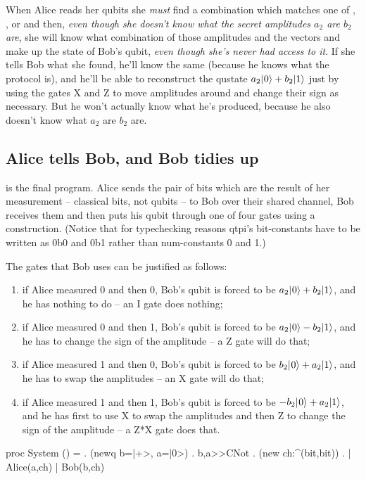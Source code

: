 When Alice reads her qubits she \emph{must} find a combination which matches one of \zerozero, \zeroone, \onezero{} or \oneone{} and then, \emph{even though she doesn't know what the secret amplitudes $a_{2}$ are $b_{2}$ are}, she will know what combination of those amplitudes and the vectors \zero{} and \one{} make up the state of Bob's qubit, \emph{even though she's never had access to it}. If she tells Bob what she found, he'll know the same (because he knows what the protocol is), and he'll be able to reconstruct the qustate $a_{2}|\hspace{0.5pt}0\rangle+b_{2}|1\rangle\relax$ just by using the gates X and Z to move amplitudes around and change their sign as necessary. But he won't actually know what he's produced, because he also doesn't know what $a_{2}$ are $b_{2}$ are.

\subsection{Alice tells Bob, and Bob tidies up}

 is the final program. Alice sends the pair of bits which are the result of her measurement -- classical bits, not qubits -- to Bob over their shared channel, Bob receives them and then puts his qubit through one of four gates using a  construction. (Notice that for typechecking reasons qtpi's bit-constants have to be written as 0b0 and 0b1 rather than num-constants 0 and 1.) 

The gates that Bob uses can be justified as follows:

\begin{enumerate}
\item if Alice measured 0 and then 0, Bob's qubit is forced to be $a_{2}|\hspace{0.5pt}0\rangle+b_{2}|1\rangle\relax$, and he has nothing to do -- an I gate does nothing; 
\item if Alice measured 0 and then 1, Bob's qubit is forced to be $a_{2}|\hspace{0.5pt}0\rangle-b_{2}|1\rangle\relax$, and he has to change the sign of the \one{} amplitude -- a Z gate will do that;
\item if Alice measured 1 and then 0, Bob's qubit is forced to be $b_{2}|\hspace{0.5pt}0\rangle+a_{2}|1\rangle\relax$, and he has to swap the amplitudes -- an X gate will do that;
\item if Alice measured 1 and then 1, Bob's qubit is forced to be $-b_{2}|\hspace{0.5pt}0\rangle+a_{2}|1\rangle\relax$, and he has first to use X to swap the amplitudes and then Z to change the sign of the \one{} amplitude -- a Z*X gate does that. 
\end{enumerate}

\mvb{\teleportfinal}
proc System () = 
        . (newq b=|+>, a=|0>)  
        . b,a>>CNot 
        . (new ch:^(bit,bit))
        . | Alice(a,ch) | Bob(b,ch)

